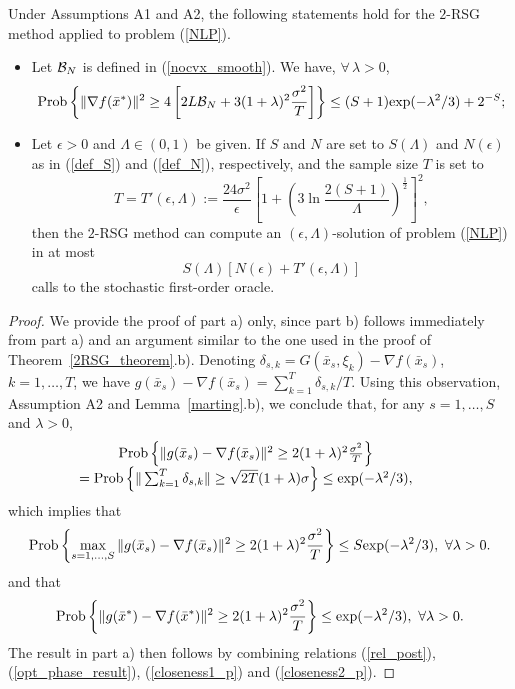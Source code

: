 \documentclass[final]{siamltex}
\newcommand{\beq}{\begin{equation}}
\newcommand{\eeq}{\end{equation}}
\def\eqnok#1{(\ref{#1})}
\def\exp{{\rm exp}}
\def\prob{{\rm Prob}}
\def\prob{\mathop{\rm Prob}}
\def\cB{{\cal B}}
\begin{document}
\begin{corollary}
Under Assumptions A1 and A2, the following statements hold for the $2$-RSG method
applied to problem \eqnok{NLP}.
\begin{itemize}
\item [a)] Let ${\cal B}_N$ is defined in \eqnok{nocvx_smooth}. We have, $\forall \, \lambda > 0$,
\beq \label{2RSG_conv1_1}
\prob\left\{
\|\nabla f(\bar x^*)\|^2 \ge 4 \left[ 2 L \cB_N + 3 (1 + \lambda)^2 \frac{\sigma^2}{T} \right]
\right\} \le (S+1) \exp(-\lambda^2/3) + 2^{-S};
\eeq
\item [b)] Let $\epsilon > 0$ and $\Lambda \in (0,1)$ be given.
If $S$ and $N$ are set to $S(\Lambda)$ and $N(\epsilon)$ as in
\eqnok{def_S} and \eqnok{def_N}, respectively, and
the sample size $T$ is set to
\beq \label{def_Tbar1}
T = T'(\epsilon, \Lambda):= \frac{24 \sigma^2}{\epsilon}\left[1 + \left(3 \ln \frac{2(S+1)}{\Lambda} \right)^\frac{1}{2} \right]^2,
\eeq
then the $2$-RSG method can compute an $(\epsilon, \Lambda)$-solution of problem \eqnok{NLP}
in at most
\beq \label{bnd_comp2}
S(\Lambda) \left[ N(\epsilon) + T'(\epsilon, \Lambda)\right]
\eeq
calls to the stochastic first-order oracle.
\end{itemize}
\end{corollary}

\begin{proof}
We provide the proof of part a) only, since part b) follows immediately from part a) and
an argument similar to the one used in the proof of Theorem~\ref{2RSG_theorem}.b).
Denoting $\delta_{s,k} = G(\bar x_s, \xi_k) - \nabla f(\bar x_s)$, $k = 1, \ldots, T$,
we have $g(\bar x_s) - \nabla f(\bar x_s) = \sum_{k=1}^T \delta_{s,k} / T$. Using this observation,
Assumption A2 and Lemma~\ref{marting}.b), we conclude that, for any $s = 1, \ldots, S$ and $\lambda > 0$,
\[
\begin{array}{ccc}
\prob\left\{ \|g(\bar x_s) - \nabla f(\bar x_s)\|^2 \ge  2(1+\lambda)^2 \frac{\sigma^2}{T} \right\} &&\\
= \prob\left\{ \|\sum_{k=1}^T \delta_{s,k} \| \ge  \sqrt{2T} (1+\lambda) \sigma \right\}
\le \exp(-\lambda^2/3),
\end{array}
\]
which implies that
\beq \label{closeness1_p}
\prob\left\{
\max_{s=1,\ldots,S} \|g(\bar x_s) - \nabla f(\bar x_s)\|^2 \ge 2(1+\lambda)^2 \frac{\sigma^2}{T}
 \right\} \le S \exp(-\lambda^2/3),  \ \forall \lambda > 0.
\eeq
and that
\beq \label{closeness2_p}
\prob\left\{
\|g(\bar x^*) - \nabla f(\bar x^*)\|^2  \ge  2(1+\lambda)^2 \frac{\sigma^2}{T}
\right\} \le \exp(-\lambda^2/3), \ \forall \lambda > 0.
\eeq
The result in part a) then follows by combining relations \eqnok{rel_post}, \eqnok{opt_phase_result},
\eqnok{closeness1_p} and \eqnok{closeness2_p}.
\end{proof}
\end{document}
